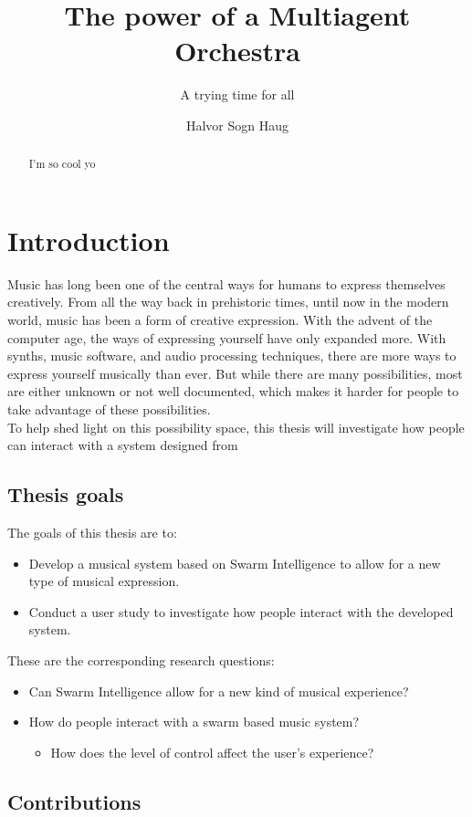 \documentclass[a4paper,english]{report}
\title{The power of a Multiagent Orchestra}
\subtitle{A trying time for all}
\author{Halvor Sogn Haug}
\begin{document}
	\duoforside[dept={Institute of informatics},
	program={Informatics: Robotics and Intelligent Systems},
	long]
	\begin{abstract}
		I'm so cool yo
	\end{abstract}
	\tableofcontents
	
	\chapter{Introduction}
	Music has long been one of the central ways for humans to express themselves creatively. From all the way back in prehistoric times, until now in the modern world, music has been a form of creative expression. With the advent of the computer age, the ways of expressing yourself have only expanded more. With synths, music software, and audio processing techniques, there are more ways to express yourself musically than ever. But while there are many possibilities, most are either unknown or not well documented, which makes it harder for people to take advantage of these possibilities. 
	\\
	To help shed light on this possibility space, this thesis will investigate how people can interact with a system designed from 
	\section{Thesis goals}
	The goals of this thesis are to:
	\begin{itemize}
		\item Develop a musical system based on Swarm Intelligence to allow for a new type of musical expression.
		\item Conduct a user study to investigate how people interact with the developed system.
	\end{itemize}
	These are the corresponding research questions:
	\begin{itemize}
		\item Can Swarm Intelligence allow for a new kind of musical experience?
		\item How do people interact with a swarm based music system?
		\begin{itemize}
			\item How does the level of control affect the user's experience?
		\end{itemize}
	\end{itemize}
	\section{Contributions}
\end{document}
